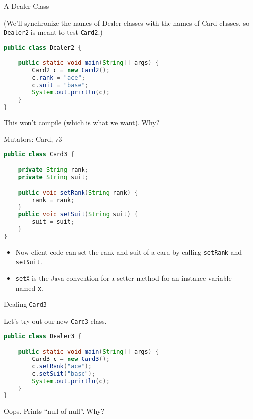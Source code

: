 \documentclass{beamer}
\begin{document}
\begin{frame}[fragile]{A Dealer Class}


(We'll synchronize the names of Dealer classes with the names of Card classes, so {\tt Dealer2} is meant to test {\tt Card2}.) 
\begin{lstlisting}[language=Java]
public class Dealer2 {

    public static void main(String[] args) {
        Card2 c = new Card2();
        c.rank = "ace";
        c.suit = "base";
        System.out.println(c);
    }
}
\end{lstlisting}

This won't compile (which is what we want). Why?

\end{frame}

\begin{frame}[fragile]{Mutators: Card, v3}

\begin{lstlisting}[language=Java]
public class Card3 {

    private String rank;
    private String suit;

    public void setRank(String rank) {
        rank = rank;
    }
    public void setSuit(String suit) {
        suit = suit;
    }
}
\end{lstlisting}
\begin{itemize}
\item Now client code can set the rank and suit of a card by calling {\tt setRank} and {\tt setSuit}.
\item {\tt setX} is the Java convention for a setter method for an instance variable named {\tt x}.
\end{itemize}

\end{frame}

\begin{frame}[fragile]{Dealing {\tt Card3}}


Let's try out our new {\tt Card3} class.
\begin{lstlisting}[language=Java]
public class Dealer3 {

    public static void main(String[] args) {
        Card3 c = new Card3();
        c.setRank("ace");
        c.setSuit("base");
        System.out.println(c);
    }
}
\end{lstlisting}

Oops.  Prints ``null of null''.  Why?


\end{frame}
\end{document}
